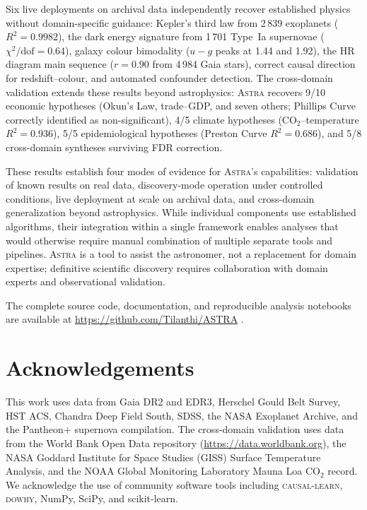 \documentclass[usenatbib]{rasti}
\newcommand{\astra}{\textsc{Astra}\xspace}
\begin{document}
Six live deployments on archival data independently recover established physics without domain-specific guidance: Kepler's third law from 2\,839 exoplanets ($R^{2}=0.9982$), the dark energy signature from 1\,701 Type~Ia supernovae ($\chi^{2}/\mathrm{dof}=0.64$), galaxy colour bimodality ($u{-}g$ peaks at 1.44 and 1.92), the HR diagram main sequence ($r=0.90$ from 4\,984 Gaia stars), correct causal direction for redshift--colour, and automated confounder detection.
The cross-domain validation extends these results beyond astrophysics: \astra recovers 9/10 economic hypotheses (Okun's Law, trade--GDP, and seven others; Phillips Curve correctly identified as non-significant), 4/5 climate hypotheses (CO$_{2}$--temperature $R^{2}=0.936$), 5/5 epidemiological hypotheses (Preston Curve $R^{2}=0.686$), and 5/8 cross-domain syntheses surviving FDR correction.

These results establish four modes of evidence for \astra's capabilities: validation of known results on real data, discovery-mode operation under controlled conditions, live deployment at scale on archival data, and cross-domain generalization beyond astrophysics.
While individual components use established algorithms, their integration within a single framework enables analyses that would otherwise require manual combination of multiple separate tools and pipelines.
\astra is a tool to assist the astronomer, not a replacement for domain expertise; definitive scientific discovery requires collaboration with domain experts and observational validation.

The complete source code, documentation, and reproducible analysis notebooks are available at \url{https://github.com/Tilanthi/ASTRA} \citep{White2026}.

\section*{Acknowledgements}

This work uses data from Gaia DR2 and EDR3, Herschel Gould Belt Survey, HST ACS, Chandra Deep Field South, SDSS, the NASA Exoplanet Archive, and the Pantheon+ supernova compilation.
The cross-domain validation uses data from the World Bank Open Data repository (\url{https://data.worldbank.org}), the NASA Goddard Institute for Space Studies (GISS) Surface Temperature Analysis, and the NOAA Global Monitoring Laboratory Mauna Loa CO$_{2}$ record.
We acknowledge the use of community software tools including \textsc{causal-learn}, \textsc{dowhy}, NumPy, SciPy, and scikit-learn.
\end{document}
